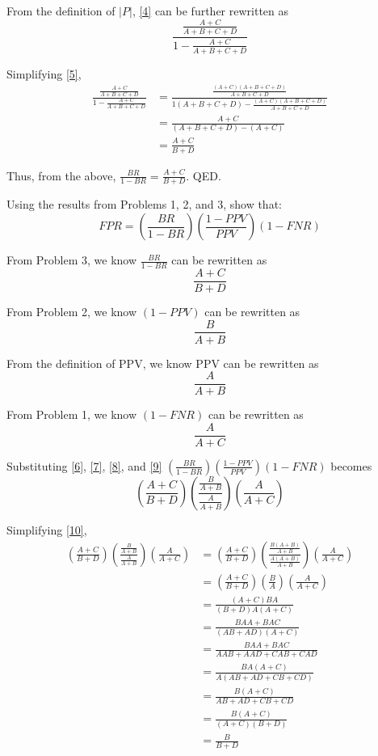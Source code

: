 \documentclass{cisXXX} %
\begin{document}
From the definition of $|P|$, \eqref{4} can be further rewritten as
\begin{equation}
\label{5} \frac{\frac{A+C}{A+B+C+D}}{1-\frac{A+C}{A+B+C+D}}
\end{equation}

Simplifying \eqref{5},
\begin{align*}
\frac{\frac{A+C}{A+B+C+D}}{1-\frac{A+C}{A+B+C+D}} &= \frac{\frac{(A+C)(A+B+C+D)}{A+B+C+D}}{1(A+B+C+D)-\frac{(A+C)(A+B+C+D)}{A+B+C+D}}\\
&= \frac{A+C}{(A+B+C+D) - (A+C)}\\
&= \frac{A+C}{B+D}
\end{align*}

Thus, from the above, $\frac{BR}{1-BR} = \frac{A+C}{B+D}$. QED.

\HWproblem
Using the results from Problems 1, 2, and 3, show that:
$$FPR = (\frac{BR}{1-BR})(\frac{1-PPV}{PPV})(1 -FNR)$$

From Problem 3, we know $\frac{BR}{1-BR}$ can be rewritten as
\begin{equation}
\label{6} \frac{A+C}{B+D}
\end{equation}

From Problem 2, we know $(1-PPV)$ can be rewritten as
\begin{equation}
\label{7} \frac{B}{A+B}
\end{equation}

From the definition of PPV, we know PPV can be rewritten as
\begin{equation}
\label{8} \frac{A}{A+B}
\end{equation}

From Problem 1, we know $(1-FNR)$ can be rewritten as
\begin{equation}
\label{9} \frac{A}{A+C}
\end{equation}

Substituting \eqref{6}, \eqref{7}, \eqref{8}, and \eqref{9} $(\frac{BR}{1-BR})(\frac{1-PPV}{PPV})(1 -FNR)$ becomes
\begin{equation}
\label{10} (\frac{A+C}{B+D})(\frac{\frac{B}{A+B}}{\frac{A}{A+B}})(\frac{A}{A+C})
\end{equation}

Simplifying \eqref{10},
\begin{align*}
(\frac{A+C}{B+D})(\frac{\frac{B}{A+B}}{\frac{A}{A+B}})(\frac{A}{A+C}) &= (\frac{A+C}{B+D})(\frac{\frac{B(A+B)}{A+B}}{\frac{A(A+B)}{A+B}})(\frac{A}{A+C})\\
&= (\frac{A+C}{B+D})(\frac{B}{A})(\frac{A}{A+C})\\
&= \frac{(A+C)BA}{(B+D)A(A+C)}\\
&= \frac{BAA+BAC}{(AB+AD)(A+C)}\\
&= \frac{BAA+BAC}{AAB+AAD+CAB+CAD}\\
&= \frac{BA(A+C)}{A(AB+AD+CB+CD)}\\
&= \frac{B(A+C)}{AB+AD+CB+CD}\\
&= \frac{B(A+C)}{(A+C)(B+D)}\\
&= \frac{B}{B+D}
\end{align*}
\end{document}
